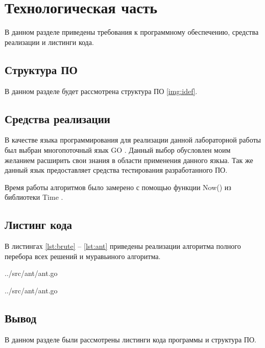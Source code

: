 \chapter{Технологическая часть}

В данном разделе приведены требования к программному обеспечению, средства реализации и листинги кода.

\section{Структура ПО}

В данном разделе будет рассмотрена структура ПО \ref{img:idef}.


\section{Средства реализации}

В качестве языка программирования для реализации данной лабораторной работы был выбран многопоточный язык GO \cite{golang}. Данный выбор обусловлен моим желанием расширить свои знания в области применения данного язкыа. Так же данный язык предоставляет средства тестирования разработанного ПО.

Время работы алгоритмов было замерено с помощью функции {\ttfamily Now()} из библиотеки {\ttfamily Time} \cite{lib:time}.

\clearpage

\section{Листинг кода}

В листингах \ref{lst:brute} -- \ref{lst:ant} приведены реализации алгоритма полного перебора всех решений и муравьиного алгоритма.

\begin{lstinputlisting}[
	caption={Алгоритм перебора всех возможных вариантов},
	label={lst:brute},
	style={go},
	linerange={194-245},
	]{../src/ant/ant.go}
\end{lstinputlisting}

\begin{lstinputlisting}[
	caption={Муравьиный алгоритм},
	label={lst:ant},
	style={go},
	linerange={85-192},
	]{../src/ant/ant.go}
\end{lstinputlisting}


\section*{Вывод}

В данном разделе были рассмотрены листинги кода программы и структура ПО.
